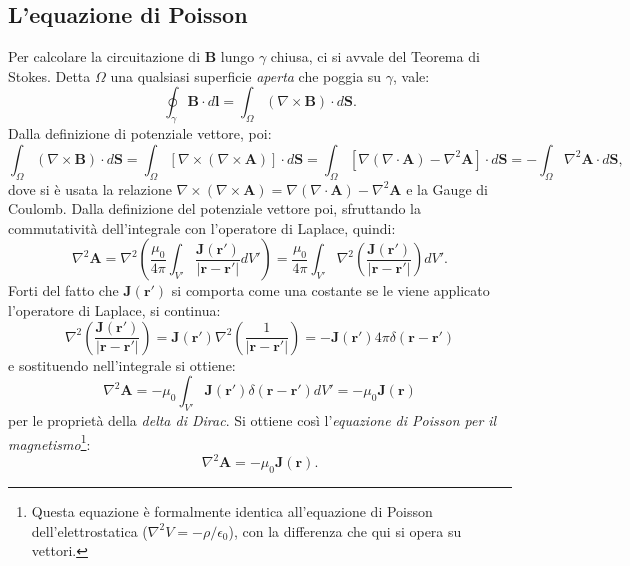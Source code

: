 \documentclass[a4paper,11pt]{report}
\begin{document}
\subsection{L'equazione di Poisson}
Per calcolare la circuitazione di $\bm{B}$ lungo $\gamma$ chiusa, ci si avvale del Teorema di Stokes. Detta $\Omega$ una qualsiasi superficie \textit{aperta} che poggia su $\gamma$, vale:
\begin{equation}
    \oint_\gamma \bm{B}\cdot d\bm{l} = \int_{\Omega} (\nabla \times \bm{B}) \cdot d\bm{S}.
    \label{eq:circ_B}
\end{equation}
Dalla definizione di potenziale vettore, poi:
\begin{equation}
    \int_{\Omega} (\nabla \times \bm{B}) \cdot d\bm{S} = \int_{\Omega} [\nabla \times( \nabla \times\bm{A})] \cdot d\bm{S} = \int_{\Omega} [\nabla(\nabla \cdot \bm{A}) - \nabla^2\bm{A}] \cdot d\bm{S} = - \int_{\Omega} \nabla^2\bm{A} \cdot d\bm{S},
\end{equation}
dove si è usata la relazione $\nabla \times( \nabla \times\bm{A}) = \nabla(\nabla \cdot \bm{A}) - \nabla^2\bm{A}$ e la Gauge di Coulomb. Dalla definizione del potenziale vettore poi, sfruttando la commutatività dell'integrale con l'operatore di Laplace, quindi:
\begin{equation}
    \nabla^2\bm{A} = \nabla^2 \left(\frac{\mu_0}{4\pi} \int_{V'} \frac{\bm{J}(\bm{r}')}{|\bm{r} - \bm{r}'|} dV' \right)= \frac{\mu_0}{4\pi} \int_{V'} \nabla^2 \left(\frac{\bm{J}(\bm{r}')}{|\bm{r} - \bm{r}'|} \right) dV'.
\end{equation}
Forti del fatto che $\bm{J}(\bm{r}')$ si comporta come una costante se le viene applicato l'operatore di Laplace, si continua: 
\begin{equation}
    \nabla^2 \left(\frac{\bm{J}(\bm{r}')}{|\bm{r} - \bm{r}'|} \right) =  \bm{J}(\bm{r}') \nabla^2\left(\frac{1}{|\bm{r} - \bm{r}'|} \right) = - \bm{J}(\bm{r}') 4\pi \delta(\bm{r} - \bm{r}')
    \label{eq:lapl_pot_vett}
\end{equation}
e sostituendo nell'integrale si ottiene:
\begin{equation}
    \nabla^2\bm{A} =- {\mu_0} \int_{V'} \bm{J}(\bm{r}')  \delta(\bm{r} - \bm{r}') dV' = -\mu_0 \bm{J}(\bm{r})
\end{equation}
per le proprietà della \textit{delta di Dirac}. Si ottiene così l'\textit{equazione di Poisson per il magnetismo}\footnote{Questa equazione è formalmente identica all'equazione di Poisson dell'elettrostatica ($\nabla^2 V = -\rho/\epsilon_0$), con la differenza che qui si opera su vettori.}:
\begin{equation}
    \nabla^2\bm{A} = -\mu_0 \bm{J}(\bm{r}).
    \label{eq:poisson_m}
\end{equation}
\end{document}
